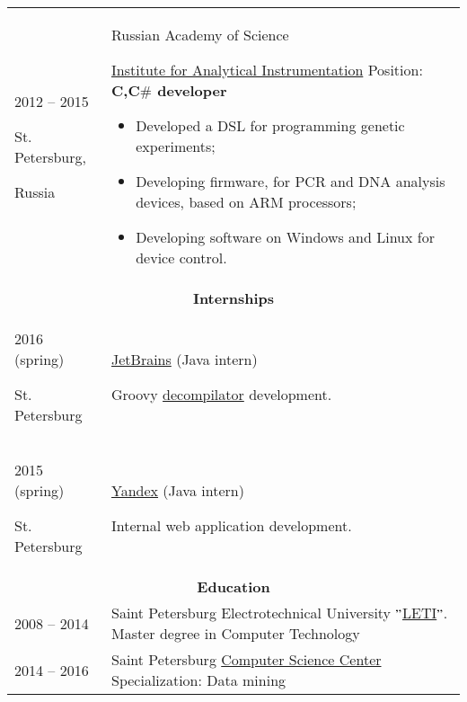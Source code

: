 \documentclass{article}
\begin{document}
\begin{longtable}{p{0.00in}p{0.00in}p{0.0in}p{0.00in}p{0.00in}}
\multicolumn{2}{p{\dimexpr1.00in+2\tabcolsep\relax}}{2012 -- 2015 \par St. Petersburg,\par Russia} &
\multicolumn{3}{p{\dimexpr5.85in+4\tabcolsep\relax}}{Russian Academy of Science\par \href{http://iairas.ru/en/}{Institute for Analytical Instrumentation}
Position: \textbf{C,C$\#$ developer} \par
\begin{itemize}
    \item Developed a DSL for programming genetic experiments;
    \item Developing firmware, for PCR and DNA analysis devices, based on ARM processors;
    \item Developing software on Windows and Linux for device control.
\end{itemize}
} \\

\multicolumn{5}{c}{\textbf{Internships}} \\

\multicolumn{2}{p{\dimexpr1.00in+2\tabcolsep\relax}}{2016 (spring) \par St. Petersburg} &
\multicolumn{3}{p{\dimexpr5.85in+4\tabcolsep\relax}}{\href{https://www.jetbrains.com/}{JetBrains} (Java intern) \par
    Groovy \href{https://github.com/dehasi/groovy-dc}{decompilator} development.
} \\

\multicolumn{2}{p{\dimexpr1.00in+2\tabcolsep\relax}}{2015 (spring) \par St. Petersburg} &
\multicolumn{3}{p{\dimexpr5.85in+4\tabcolsep\relax}}{\href{https://yandex.com/company/}{Yandex} (Java intern) \par
    Internal web application development.
} \\

\multicolumn{5}{c}{ \textbf{Education}} \\

\multicolumn{2}{p{\dimexpr1.00in+2\tabcolsep\relax}}{2008 -- 2014} &
\multicolumn{3}{p{\dimexpr5.85in+4\tabcolsep\relax}}{Saint Petersburg Electrotechnical
   University $"$\href{https://etu.ru/en/university/}{LETI}$"$. Master degree in Computer Technology
} \\

\multicolumn{2}{p{\dimexpr1.00in+2\tabcolsep\relax}}{2014 -- 2016} &
\multicolumn{3}{p{\dimexpr5.85in+4\tabcolsep\relax}}{Saint Petersburg
    \href{https://compscicenter.ru/students/714/}{Computer Science Center} Specialization: Data mining
} \\


\end{longtable}
\end{document}
